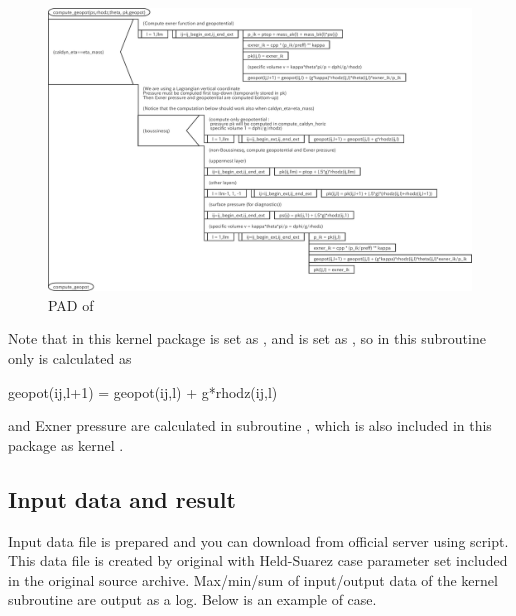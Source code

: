 \begin{figure}[p]
\centering
 \includegraphics[scale=.45]{figs/geopot.pdf}
 \caption{PAD of }
 \label{f:pad_comp_geopot}
\end{figure}

Note that in this kernel package
 is set as ,
and
 is set as ,
so in this subroutine only  is calculated as

\begin{LstF90}[numbers=none]
geopot(ij,l+1) = geopot(ij,l) + g*rhodz(ij,l)
\end{LstF90}
%
and Exner pressure
are calculated in subroutine , which is also
included in this package as kernel .

\clearpage



\subsection{Input data and result}

Input data file is prepared and you can download from official server using
 script.
%
This data file is created by original \DYNAMICO\footnotemark with
Held-Suarez case parameter set included in the original source archive.
%
%
Max/min/sum of input/output data of the kernel subroutine are output as
a log.
%
Below is an example of  case.

